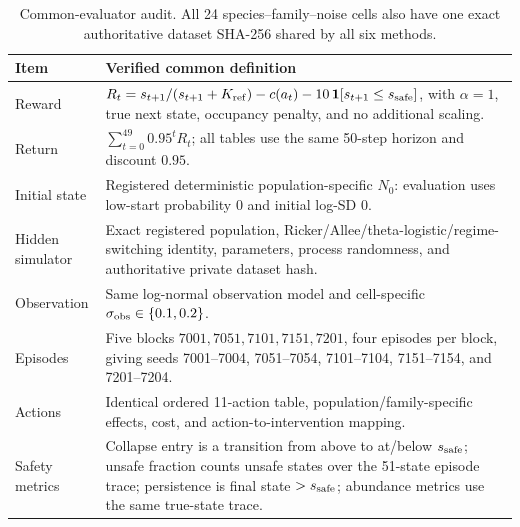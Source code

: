 \documentclass[10pt]{article}
\begin{document}
\begin{table}[ht]
\centering\small
\begin{tabular}{@{}p{3.3cm}p{11.2cm}@{}}
\toprule
Item & Verified common definition\\
\midrule
Reward & \(R_t=s_{t+1}/(s_{t+1}+K_{\rm ref})-c(a_t)-10\,\mathbf{1}[s_{t+1}\le s_{\rm safe}]\), with \(\alpha=1\), true next state, occupancy penalty, and no additional scaling.\\
Return & \(\sum_{t=0}^{49}0.95^t R_t\); all tables use the same 50-step horizon and discount \(0.95\).\\
Initial state & Registered deterministic population-specific \(N_0\): evaluation uses low-start probability \(0\) and initial log-SD \(0\).\\
Hidden simulator & Exact registered population, Ricker/Allee/theta-logistic/regime-switching identity, parameters, process randomness, and authoritative private dataset hash.\\
Observation & Same log-normal observation model and cell-specific \(\sigma_{\rm obs}\in\{0.1,0.2\}\).\\
Episodes & Five blocks \(7001,7051,7101,7151,7201\), four episodes per block, giving seeds 7001--7004, 7051--7054, 7101--7104, 7151--7154, and 7201--7204.\\
Actions & Identical ordered 11-action table, population/family-specific effects, cost, and action-to-intervention mapping.\\
Safety metrics & Collapse entry is a transition from above to at/below \(s_{\rm safe}\); unsafe fraction counts unsafe states over the 51-state episode trace; persistence is final state \(>s_{\rm safe}\); abundance metrics use the same true-state trace.\\
\bottomrule
\end{tabular}
\caption{Common-evaluator audit. All 24 species--family--noise cells also have one exact authoritative dataset SHA-256 shared by all six methods.}
\end{table}
\end{document}
